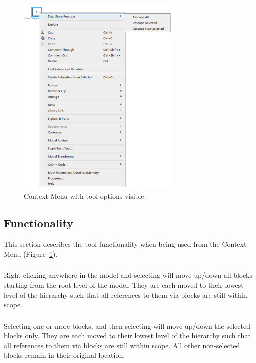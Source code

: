 \documentclass{article}
\newcommand{\menu}[2]{%
	\ifthenelse{\equal{#1}{1}}{Rescope All}{}%
  	\ifthenelse{\equal{#1}{2}}{Rescope Selected}{}%
  	\ifthenelse{\equal{#1}{3}}{Rescope Non-Selected}{}%
}
\begin{document}
\begin{figure}[htb]
	\centering
	\includegraphics[width=0.7\textwidth]{../figs/ContextMenu}
	\caption{\Simulink Context Menu with tool options visible.}
	\label{FIG:contextMenu}
\end{figure}

\newpage
\subsection{Functionality}
This section describes the tool functionality when being used from the \Simulink Context Menu (Figure~\ref{FIG:contextMenu}).

\subsubsection*{}
Right-clicking anywhere in the model and selecting  will move up/down all \DSM blocks starting from the root level of the model. They are each moved to their lowest level of the hierarchy such that all references to them via \DSRW blocks are still within scope. 

\subsubsection*{}
Selecting one or more \DSM blocks, and then selecting  will move up/down the selected \DSM blocks only. They are each moved to their lowest level of the hierarchy such that all references to them via \DSRW blocks are still within scope. All other non-selected \DSM blocks remain in their original location.
\end{document}
